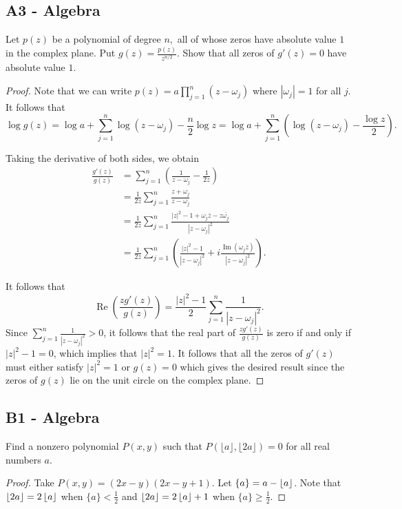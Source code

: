 \documentclass[11pt]{scrartcl}
\newcommand{\<}{\langle}
\renewcommand{\>}{\rangle}
\let \bar \overline
\begin{document}
\subsection{A3 - Algebra}
Let $p(z)$ be a polynomial of degree $n,$ all of whose zeros have absolute value $1$ in the complex plane. Put $g(z)=\frac{p(z)}{z^{n/2}}.$ Show that all zeros of $g'(z)=0$ have absolute value $1.$
\begin{proof}
Note that we can write $p(z) = a \prod_{j=1}^n (z - \omega_j)$ where $|\omega_j| = 1$ for all $j$. It follows that 
$$\log g(z) = \log a + \sum_{j=1}^n \log (z - \omega_j) - \frac{n}{2} \log z = \log a + \sum_{j=1}^n \left (\log (z - \omega_j) - \frac{\log z}{2} \right).$$

Taking the derivative of both sides, we obtain
\begin{align*}
\frac{g'(z)}{g(z)} &= \sum_{j=1}^n \left (\frac{1}{z - \omega_j} - \frac{1}{2z} \right) \\
&= \frac{1}{2z} \sum_{j=1}^n \frac{z + \omega_j}{z - \omega_j} \\
&= \frac{1}{2z} \sum_{j=1}^n \frac{|z|^2 - 1 + \omega_j \bar{z} - z \bar{\omega_j}}{|z - \omega_j|^2} \\
&= \frac{1}{2z} \sum_{j=1}^n \left ( \frac{|z|^2 - 1}{|z - \omega_j|^2} + i\frac{\operatorname{Im}(\omega_j \bar{z})}{|z - \omega_j|^2} \right).
\end{align*}

It follows that 
$$\operatorname{Re}\left (\frac{zg'(z)}{g(z)} \right) = \frac{|z|^2 - 1}{2} \sum_{j=1}^n \frac{1}{|z - \omega_j|^2}.$$
Since $\sum_{j=1}^n \frac{1}{|z - \omega_j|^2} > 0$, it follows that the real part of $\frac{zg'(z)}{g(z)}$ is zero if and only if $|z|^2 - 1 = 0$, which implies that $|z|^2 = 1$.  It follows that all the zeros of $g'(z)$ must either satisfy $|z|^2 = 1$ or $g(z) = 0$ which gives the desired result since the zeros of $g(z)$ lie on the unit circle on the complex plane.  
\end{proof}
\pagebreak
\subsection{B1 - Algebra}
Find a nonzero polynomial $P(x,y)$ such that $P(\lfloor a\rfloor,\lfloor 2a\rfloor)=0$ for all real numbers $a.$
\begin{proof}
Take $P(x, y) = (2x - y)(2x - y + 1)$.  Let $\{a\} = a - \left\lfloor a \right\rfloor$.  Note that $\left\lfloor 2a \right\rfloor = 2\left\lfloor a \right\rfloor$ when $\{a\} < \frac{1}{2}$ and $\left\lfloor 2a \right\rfloor = 2 \left\lfloor a \right\rfloor + 1$ when $\{a\} \ge \frac{1}{2}$.
\end{proof}
\end{document}

